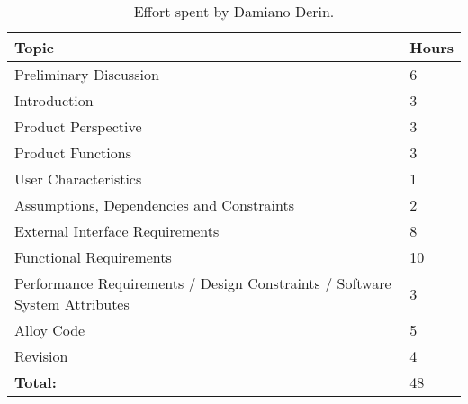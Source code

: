 \begin{table}[H]
    \centering
    \begin{tabular}{| m{} | m{} |}
        \hline
        \textbf{Topic}                                                           & \textbf{Hours} \\
        \hline
        Preliminary Discussion                                                     & 6              \\
        \hline
        Introduction                                                               & 3              \\
        \hline
        Product Perspective                                                        & 3              \\
        \hline
        Product Functions                                                          & 3              \\
        \hline
        User Characteristics                                                       & 1              \\
        \hline
        Assumptions, Dependencies and Constraints                                  & 2              \\
        \hline
        External Interface Requirements                                            & 8              \\
        \hline
        Functional Requirements                                                    & 10             \\
        \hline
        Performance Requirements / Design Constraints / Software System Attributes & 3              \\
        \hline
        Alloy Code                                                                 & 5              \\
        \hline
        Revision                                                                   & 4              \\
        \hline
        \hline
        \textbf{Total:}                                                            & 48             \\
        \hline
    \end{tabular}
    \caption{Effort spent by Damiano Derin.}
\end{table}